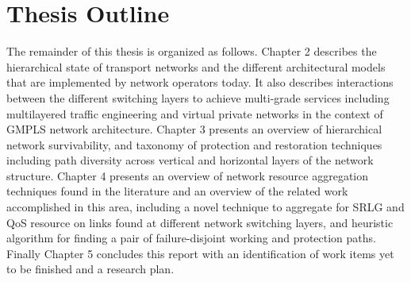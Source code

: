 \section{Thesis Outline}
The remainder of this thesis is organized as follows. Chapter 2 describes the hierarchical state of transport networks and the different architectural models that are implemented by network operators today. It also describes interactions between the different switching layers to achieve multi-grade services including multilayered traffic engineering and virtual private networks in the context of GMPLS network architecture. Chapter 3 presents an overview of hierarchical network survivability, and taxonomy of protection and restoration techniques including path diversity across vertical and horizontal layers of the network structure. Chapter 4 presents an overview of network resource aggregation techniques found in the literature and an overview of the related work accomplished in this area, including a novel technique to aggregate for SRLG and QoS resource on links found at different network switching layers, and heuristic algorithm for finding a pair of failure-disjoint working and protection paths. Finally Chapter 5 concludes this report with an identification of work items yet to be finished and a research plan.
